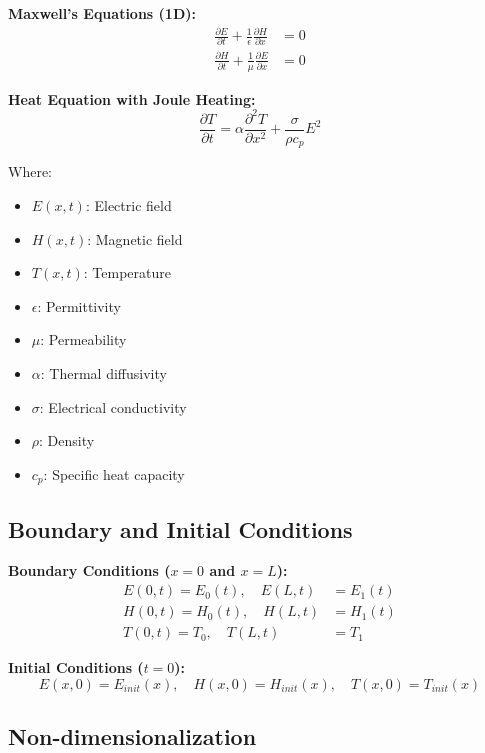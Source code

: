\documentclass[11pt,a4paper]{article}
\begin{document}
\textbf{Maxwell's Equations (1D):}
\begin{align}
    \frac{\partial E}{\partial t} + \frac{1}{\epsilon} \frac{\partial H}{\partial x} &= 0 \\[0.5em]
    \frac{\partial H}{\partial t} + \frac{1}{\mu} \frac{\partial E}{\partial x} &= 0
\end{align}

\textbf{Heat Equation with Joule Heating:}
\begin{equation}
    \frac{\partial T}{\partial t} = \alpha \frac{\partial^2 T}{\partial x^2} + \frac{\sigma}{\rho c_p} E^2
\end{equation}

Where:
\begin{itemize}
    \item $E(x,t)$: Electric field
    \item $H(x,t)$: Magnetic field
    \item $T(x,t)$: Temperature
    \item $\epsilon$: Permittivity
    \item $\mu$: Permeability
    \item $\alpha$: Thermal diffusivity
    \item $\sigma$: Electrical conductivity
    \item $\rho$: Density
    \item $c_p$: Specific heat capacity
\end{itemize}

\subsection{Boundary and Initial Conditions}

\textbf{Boundary Conditions ($x = 0$ and $x = L$):}
\begin{align}
    E(0,t) = E_0(t), \quad E(L,t) &= E_1(t) \\
    H(0,t) = H_0(t), \quad H(L,t) &= H_1(t) \\
    T(0,t) = T_0, \quad T(L,t) &= T_1
\end{align}

\textbf{Initial Conditions ($t = 0$):}
\begin{equation}
    E(x,0) = E_{init}(x), \quad H(x,0) = H_{init}(x), \quad T(x,0) = T_{init}(x)
\end{equation}

\subsection{Non-dimensionalization}
\end{document}
